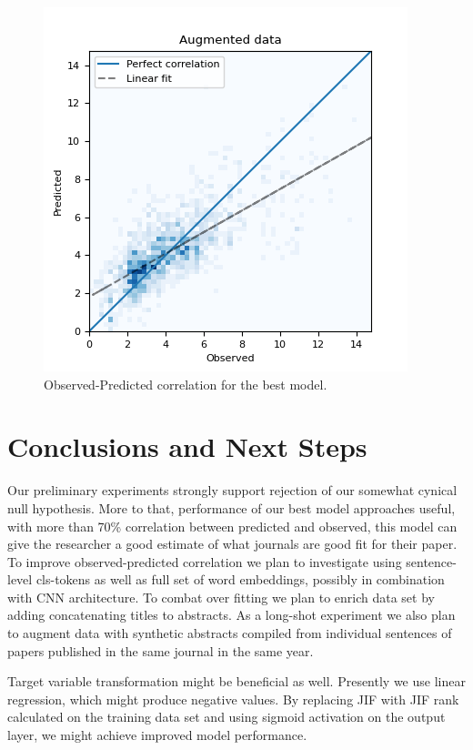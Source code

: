 \documentclass[11pt]{article}
\begin{document}
\begin{figure}
	\includegraphics[width= \columnwidth]{./Images/Best model.png}
	\caption{Observed-Predicted correlation for the best model.}
	\label{fig:best_model_corr}
\end{figure}

\section{Conclusions and Next Steps}
Our preliminary experiments strongly support rejection of our somewhat cynical null hypothesis. More to that, performance of our best model approaches useful, with more than 70\% correlation between predicted and observed, this model can give the researcher a good estimate of what journals are good fit for their paper. 
To improve observed-predicted correlation we plan to investigate using sentence-level cls-tokens as well as full set of word embeddings, possibly in combination with CNN architecture. To combat over fitting we plan to enrich data set by adding concatenating titles to abstracts. As a long-shot experiment we also plan to augment data with synthetic abstracts compiled from individual sentences of papers published in the same journal in the same year.

Target variable transformation might be beneficial as well. Presently we use linear regression, which might produce negative values. By replacing JIF with JIF rank calculated on the training data set and using sigmoid activation on the output layer, we might achieve improved model performance. 



\end{document}

